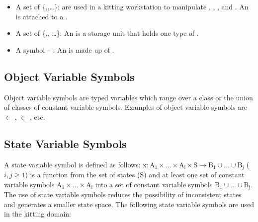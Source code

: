 \begin{itemize}
\item A set of  \{,,\ldots\}:  are used in a kitting workstation to manipulate , , , and . An  is attached to a .

\item A set of   \{,, \ldots\}: An  is a storage unit that holds one type of .

\item A symbol  -- : An  is made up of .
\end{itemize}

\subsection{Object Variable Symbols}
Object variable symbols are typed variables which range over a class or the union of classes of constant variable symbols. Examples of object variable symbols are  $\in$ ,  $\in$ , etc.

\subsection{State Variable Symbols}
\label{subsubsect:State_Variable_Symbols}
A state variable symbol is defined as follows:
$\mathrm{x: A_1\times \dots\times A_i\times S\rightarrow B_1\cup\dots\cup B_j}$ ($i, j\geq 1$) is a function from the set of states ($\mathrm{S}$) and at least one set of constant variable symbols $\mathrm{A_1\times \dots\times A_i}$ into a set of constant variable symbols $\mathrm{B_1\cup\dots\cup B_j}$.\\

\noindent
The use of state variable symbols reduces the possibility of inconsistent states and generates a smaller state space. The following state variable symbols are used in the kitting domain:

